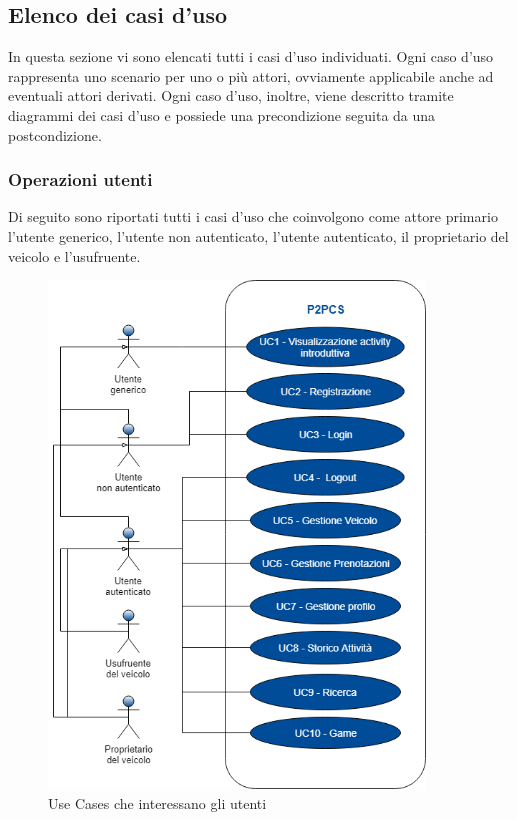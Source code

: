 \subsection{Elenco dei casi d'uso}
In questa sezione vi sono elencati tutti i casi d'uso individuati. Ogni caso d'uso rappresenta uno scenario per uno o più attori, ovviamente applicabile anche ad eventuali attori derivati. Ogni caso d'uso, inoltre, viene descritto tramite diagrammi dei casi d'uso e possiede una precondizione seguita da una postcondizione.
\subsubsection*{Operazioni utenti}
Di seguito sono riportati tutti i casi d'uso che coinvolgono come attore primario l'utente generico, l'utente non autenticato, l'utente autenticato, il proprietario del veicolo e l'usufruente.

\begin{figure}[H]
	\includegraphics[width=10cm]{res/images/UseCase.png}
	\centering
	\caption{Use Cases che interessano gli utenti}
\end{figure}






\pagebreak
